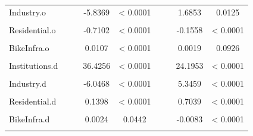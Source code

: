 \documentclass[smallextended]{svjour3}       %
\begin{document}
\begin{landscape}
\begin{table}
{\begin{tabular}[t]{lcccccccc}
Industry.o &  &  & -5.8369 & < 0.0001 &  &  & 1.6853 & 0.0125\\
\cellcolor{gray!6}{Office.o} & \cellcolor{gray!6}{} & \cellcolor{gray!6}{} & \cellcolor{gray!6}{-11.2755} & \cellcolor{gray!6}{< 0.0001} & \cellcolor{gray!6}{} & \cellcolor{gray!6}{} & \cellcolor{gray!6}{-10.2228} & \cellcolor{gray!6}{< 0.0001}\\
Residential.o &  &  & -0.7102 & < 0.0001 &  &  & -0.1558 & < 0.0001\\
\cellcolor{gray!6}{BusStops.o} & \cellcolor{gray!6}{} & \cellcolor{gray!6}{} & \cellcolor{gray!6}{1.6269} & \cellcolor{gray!6}{< 0.0001} & \cellcolor{gray!6}{} & \cellcolor{gray!6}{} & \cellcolor{gray!6}{1.7688} & \cellcolor{gray!6}{< 0.0001}\\
BikeInfra.o &  &  & 0.0107 & < 0.0001 &  &  & 0.0019 & 0.0926\\
\cellcolor{gray!6}{Population.d} & \cellcolor{gray!6}{} & \cellcolor{gray!6}{} & \cellcolor{gray!6}{-166.7009} & \cellcolor{gray!6}{< 0.0001} & \cellcolor{gray!6}{} & \cellcolor{gray!6}{} & \cellcolor{gray!6}{-97.1404} & \cellcolor{gray!6}{< 0.0001}\\
Institutions.d &  &  & 36.4256 & < 0.0001 &  &  & 24.1953 & < 0.0001\\
\cellcolor{gray!6}{Commercial.d} & \cellcolor{gray!6}{} & \cellcolor{gray!6}{} & \cellcolor{gray!6}{1.5804} & \cellcolor{gray!6}{7e-04} & \cellcolor{gray!6}{} & \cellcolor{gray!6}{} & \cellcolor{gray!6}{-8.0098} & \cellcolor{gray!6}{< 0.0001}\\
Industry.d &  &  & -6.0468 & < 0.0001 &  &  & 5.3459 & < 0.0001\\
\cellcolor{gray!6}{Office.d} & \cellcolor{gray!6}{} & \cellcolor{gray!6}{} & \cellcolor{gray!6}{6.8574} & \cellcolor{gray!6}{< 0.0001} & \cellcolor{gray!6}{} & \cellcolor{gray!6}{} & \cellcolor{gray!6}{15.0947} & \cellcolor{gray!6}{< 0.0001}\\
Residential.d &  &  & 0.1398 & < 0.0001 &  &  & 0.7039 & < 0.0001\\
\cellcolor{gray!6}{BusStops.d} & \cellcolor{gray!6}{} & \cellcolor{gray!6}{} & \cellcolor{gray!6}{-1.503} & \cellcolor{gray!6}{< 0.0001} & \cellcolor{gray!6}{} & \cellcolor{gray!6}{} & \cellcolor{gray!6}{-1.2592} & \cellcolor{gray!6}{< 0.0001}\\
BikeInfra.d &  &  & 0.0024 & 0.0442 &  &  & -0.0083 & < 0.0001\\
\cellcolor{gray!6}{Full\_time\_jobs.d} & \cellcolor{gray!6}{} & \cellcolor{gray!6}{} & \cellcolor{gray!6}{0.1907} & \cellcolor{gray!6}{< 0.0001} & \cellcolor{gray!6}{} & \cellcolor{gray!6}{} & \cellcolor{gray!6}{0.0796} & \cellcolor{gray!6}{< 0.0001}\\

\end{tabular}}
\end{table}
\end{landscape}
\end{document}

